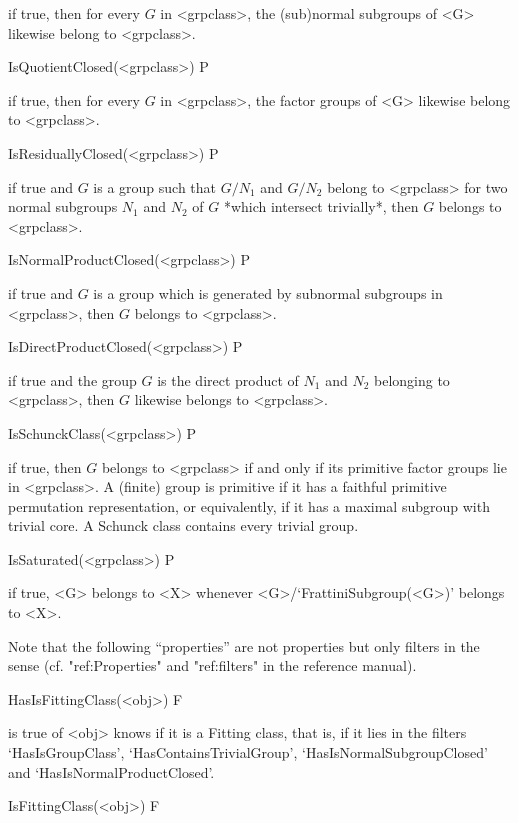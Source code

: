 if true, then for every $G$ in <grpclass>, the (sub)normal subgroups of <G>
likewise belong to <grpclass>.

\> IsQuotientClosed(<grpclass>) P

if true, then for every $G$ in <grpclass>, the factor groups of <G>
likewise belong to <grpclass>.

\> IsResiduallyClosed(<grpclass>) P

if true and $G$ is a group such that $G/N_1$ and $G/N_2$ belong to
<grpclass> for two normal subgroups $N_1$ and $N_2$ of $G$ *which intersect
trivially*, then $G$ belongs to <grpclass>.

\> IsNormalProductClosed(<grpclass>) P

if true and $G$ is a group which is generated by subnormal subgroups in <grpclass>,
then $G$ belongs to <grpclass>.

\> IsDirectProductClosed(<grpclass>) P

if true and the group $G$ is the direct product of $N_1$ and
$N_2$ belonging to <grpclass>, then $G$ likewise belongs to
<grpclass>.

\> IsSchunckClass(<grpclass>) P

if true, then $G$ belongs to <grpclass> if and only if its primitive
factor groups lie in <grpclass>. A (finite) group is primitive if it has a
faithful primitive permutation representation, or equivalently, if it has a
maximal subgroup with trivial core. A Schunck class contains every trivial
group. 

\>IsSaturated(<grpclass>) P

if true, <G> belongs to <X> whenever <G>/`FrattiniSubgroup(<G>)' belongs to
<X>.


\null


Note that the following ``properties'' are not properties but only filters in
the {\GAP} sense (cf. "ref:Properties" and "ref:filters" in the {\GAP}
reference manual).

\>HasIsFittingClass(<obj>) F

is true of <obj> knows if it is a Fitting class, that is, if it lies in the
filters  `HasIsGroupClass', `HasContainsTrivialGroup',
`HasIsNormalSubgroupClosed'  and `HasIsNormalProductClosed'.

\>IsFittingClass(<obj>) F

